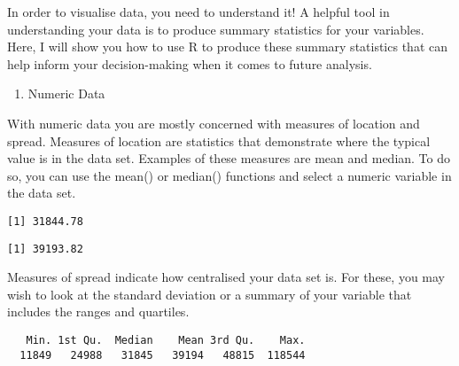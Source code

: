 \documentclass[
  letterpaper,
  DIV=11,
  numbers=noendperiod]{scrreprt}
\newenvironment{Shaded}{\begin{snugshade}}{\end{snugshade}}
\newcommand{\FunctionTok}[1]{\textcolor[rgb]{0.28,0.35,0.67}{#1}}
\newcommand{\NormalTok}[1]{\textcolor[rgb]{0.00,0.23,0.31}{#1}}
\newcommand{\SpecialCharTok}[1]{\textcolor[rgb]{0.37,0.37,0.37}{#1}}
\providecommand{\tightlist}{%
  \setlength{\itemsep}{0pt}\setlength{\parskip}{0pt}}\usepackage{longtable,booktabs,array}
\begin{document}
In order to visualise data, you need to understand it! A helpful tool in
understanding your data is to produce summary statistics for your
variables. Here, I will show you how to use R to produce these summary
statistics that can help inform your decision-making when it comes to
future analysis.

\begin{enumerate}
\def\labelenumi{\arabic{enumi}.}
\tightlist
\item
  Numeric Data
\end{enumerate}

With numeric data you are mostly concerned with measures of location and
spread. Measures of location are statistics that demonstrate where the
typical value is in the data set. Examples of these measures are mean
and median. To do so, you can use the mean() or median() functions and
select a numeric variable in the data set.

\begin{Shaded}
\end{Shaded}

\begin{verbatim}
[1] 31844.78
\end{verbatim}

\begin{Shaded}
\end{Shaded}

\begin{verbatim}
[1] 39193.82
\end{verbatim}

Measures of spread indicate how centralised your data set is. For these,
you may wish to look at the standard deviation or a summary of your
variable that includes the ranges and quartiles.

\begin{Shaded}
\end{Shaded}

\begin{verbatim}
   Min. 1st Qu.  Median    Mean 3rd Qu.    Max. 
  11849   24988   31845   39194   48815  118544 
\end{verbatim}
\end{document}
